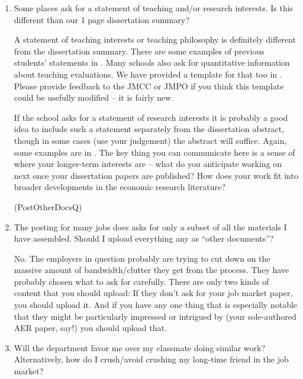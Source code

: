 \documentclass{econtex}
\providecommand\phantomsection{}
\begin{document}
\begin{enumerate}
\item Some places ask for a statement of teaching and/or research
  interests.  Is this different than our 1 page
  dissertation summary?

  A statement of teaching interests or teaching philosophy is
  definitely different from the dissertation summary.  There are some
  examples of previous students' statements in \Resources.  Many
  schools also ask for quantitative information about teaching
  evaluations.  We have provided a template for that too in
  \Templates.  Please provide feedback to the JMCC or JMPO if you
  think this template could be usefully modified -- it is fairly new.

If the school asks for a statement of research interests it is probably
a good idea to include such a statement separately from the dissertation
abstract, though in some cases (use your judgement) the abstract will suffice.  Again, some examples are in \Resources.  
The key thing you can communicate here is a sense of where your longer-term 
interests are -- what do you anticipate working on next once your dissertation
papers are published?  How does your work fit into broader developments in 
the economic research literature?

\ifdvi\phantomsection\hypertarget{PostOtherDocsQ}{(PostOtherDocsQ)}\fi
\item The {\JOE} posting for many jobs does asks for only a subset of all the materials I have assembled.  Should I upload everything any as ``other documents''?

  No. The employers in question probably are trying to cut down on the massive amount of bandwidth/clutter they get from the process.  They have probably chosen what to ask for carefully.  There are only two kinds of content that you should upload: If they don't ask for your job market paper, you should upload it. And if you have any one thing that is especially notable that they might be particularly impressed or intrigued by (your sole-authored AER paper, say!) you should upload that.

\item Will the department favor me over my classmate doing similar work?  Alternatively, how do I crush/avoid crushing my long-time friend in the job market?


\end{enumerate}
\end{document}
